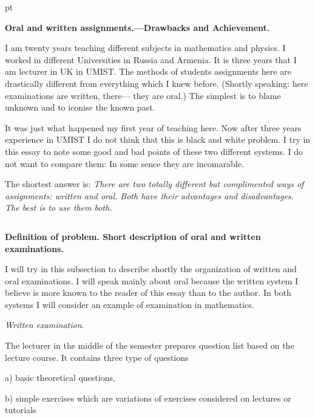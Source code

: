 
 pt

\centerline {\bf Oral and written assignments.---Drawbacks and Achievement.}


          I am twenty years teaching different subjects in mathematics and physics. I worked in different
          Universities in Russia and Armenia. It is three years that I am lecturer in UK in UMIST.
           The methods of students assignments
           here are drastically different from everything which I knew before.
           (Shortly speaking: here examinations are written, there--- they are oral.)
           The simplest is to blame unknown and to iconise the known past.

           It was just what happened my first year of teaching here.
           Now after three years experience in UMIST I do not think that
           this is black and white problem.  I try in this essay to note
            some good and bad points of these two different systems.
            I do not want to compare them: In some sence they are incomarable.

             The shortest answer is: {\it There are two totally different
              but complimented ways of assignments: written and oral. Both
              have their advantages and disadvantages. The best is to use them both.}


                $$ $$

               \centerline {\bf Definition of problem. Short description of oral and written examinations.}

               \bigskip


                 I will try in this subsection to describe shortly the organization of
                 written and oral examinations. I will speak mainly about oral because
                  the written system I believe is more known to the reader of this essay than to the author.
                  In both systems I will consider an example of examination in mathematics.



                 {\it Written examination}.


                 The lecturer  in the middle of the semester
                 prepares question list based on the lecture course.
                 It contains three type of questions

                 a) basic theoretical questions,

                 b) simple exercises which are variations of exercises considered on lectures or tutorials

